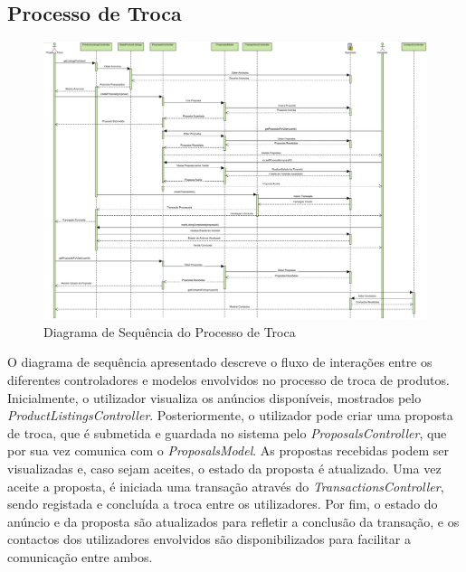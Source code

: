 \documentclass[a4paper, 12pt]{article} %
\begin{document}
\subsection{Processo de Troca}
\begin{figure}[ht]
	\centering
	\includegraphics[width=\textwidth]{../images/sequence-diagram-swap.png}
	\caption{Diagrama de Sequência do Processo de Troca}
	\label{fig:diagrama_sequencia_troca}
\end{figure}

O diagrama de sequência apresentado descreve o fluxo de interações entre os diferentes controladores e modelos envolvidos no processo de troca de produtos. Inicialmente, o utilizador visualiza os anúncios disponíveis, mostrados pelo \textit{ProductListingsController}. Posteriormente, o utilizador pode criar uma proposta de troca, que é submetida e guardada no sistema pelo \textit{ProposalsController}, que por sua vez comunica com o \textit{ProposalsModel}. As propostas recebidas podem ser visualizadas e, caso sejam aceites, o estado da proposta é atualizado. Uma vez aceite a proposta, é iniciada uma transação através do \textit{TransactionsController}, sendo registada e concluída a troca entre os utilizadores. Por fim, o estado do anúncio e da proposta são atualizados para refletir a conclusão da transação, e os contactos dos utilizadores envolvidos são disponibilizados para facilitar a comunicação entre ambos.
\end{document}
